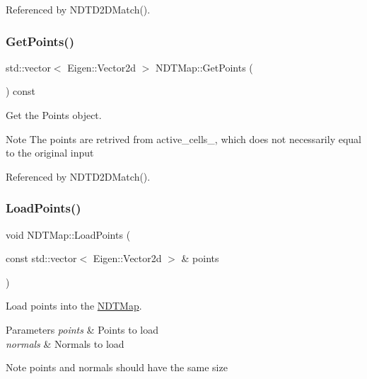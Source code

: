 Referenced by N\+D\+T\+D2\+D\+Match().

\mbox{\label{classNDTMap_a2b44ded259db4af8c4abffed0553e6c0}} 
\subsubsection{\texorpdfstring{Get\+Points()}{GetPoints()}}
{\footnotesize\ttfamily std\+::vector$<$ Eigen\+::\+Vector2d $>$ N\+D\+T\+Map\+::\+Get\+Points (\begin{DoxyParamCaption}{ }\end{DoxyParamCaption}) const}



Get the Points object. 

\begin{DoxyNote}{Note}
The points are retrived from active\+\_\+cells\+\_\+, which does not necessarily equal to the original input 
\end{DoxyNote}


Referenced by N\+D\+T\+D2\+D\+Match().

\mbox{\label{classNDTMap_ab22791d0b328ae9639799bc5d31d8b49}} 
\subsubsection{\texorpdfstring{Load\+Points()}{LoadPoints()}}
{\footnotesize\ttfamily void N\+D\+T\+Map\+::\+Load\+Points (\begin{DoxyParamCaption}\item[{const std\+::vector$<$ Eigen\+::\+Vector2d $>$ \&}]{points }\end{DoxyParamCaption})}



Load points into the \hyperlink{classNDTMap}{N\+D\+T\+Map}. 


\begin{DoxyParams}{Parameters}
{\em points} & Points to load \\
\hline
{\em normals} & Normals to load \\
\hline
\end{DoxyParams}
\begin{DoxyNote}{Note}
{\ttfamily points} and {\ttfamily normals} should have the same size 
\end{DoxyNote}
\mbox{\label{classNDTMap_a00f9fe19e50c264cb4cf1de68f0c05e3}} 
